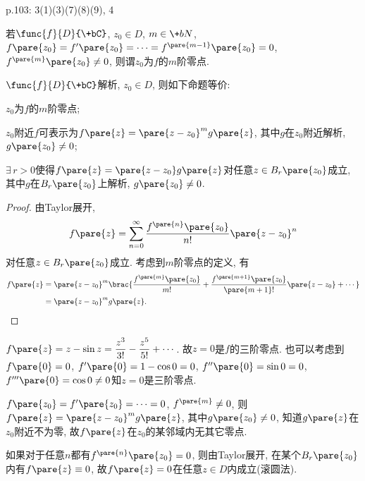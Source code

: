 \documentclass[../ComplexVariable.tex]{subfiles}
\begin{document}
p.103: 3(1)(3)(7)(8)(9), 4


\begin{definition}
    若$\func{f}{D}{\+bC}$, $z_0\in D$, $m\in \+bN$, $f\pare{z_0} = f'\pare{z_0} = \cdots = f^{\pare{m-1}}\pare{z_0} = 0$, $f^{\pare{m}}\pare{z_0}\neq 0$, 则谓$z_0$为$f$的$m$阶零点.
\end{definition}
\begin{theorem}
    $\func{f}{D}{\+bC}$解析, $z_0 \in D$, 则如下命题等价:
    \begin{cenum}
        \item $z_0$为$f$的$m$阶零点;
        \item $z_0$附近$f$可表示为$f\pare{z} = \pare{z-z_0}^mg\pare{z}$, 其中$g$在$z_0$附近解析, $g\pare{z_0}\neq 0$;
        \item $\exists\, r>0$使得$f\pare{z} = \pare{z-z_0}g\pare{z}$对任意$z\in B_r\pare{z_0}$成立, 其中$g$在$B_r\pare{z_0}$上解析, $g\pare{z_0}\neq 0$.
    \end{cenum}
\end{theorem}
\begin{proof}
    由Taylor展开,
    \[ f\pare{z} = \sum_{n=0}^\infty \frac{f^{\pare{n}}\pare{z_0}}{n!}\pare{z-z_0}^n \]
    对任意$z\in B_r\pare{z_0}$成立. 考虑到$m$阶零点的定义, 有
    \begin{align*}
        f\pare{z} &= \pare{z-z_0}^m \brac{\frac{f^{\pare{m}}\pare{z_0}}{m!} + \frac{f^{\pare{m+1}}\pare{z_0}}{\pare{m+1}!}\pare{z-z_0} + \cdots}\\ & = \pare{z-z_0}^m g\pare{z}. \qedhere
    \end{align*}
\end{proof}
\begin{sample}
    \begin{ex}
        $f\pare{z} = \displaystyle z-\sin z = \frac{z^3}{3!} - \frac{z^5}{5!} + \cdots$. 故$z=0$是$f$的三阶零点. 也可以考虑到$f\pare{0} = 0$, $f'\pare{0} = 1-\cos 0 = 0$, $f''\pare{0} = \sin 0 = 0$, $f'''\pare{0} = \cos 0 \neq 0$知$z=0$是三阶零点.
    \end{ex}
\end{sample}
\begin{remark}
    $f\pare{z_0} = f'\pare{z_0} = \cdots = 0$, $f^{\pare{m}}\neq 0$, 则$f\pare{z} = \pare{z-z_0}^mg\pare{z}$, 其中$g\pare{z_0}\neq 0$, 知道$g\pare{z}$在$z_0$附近不为零, 故$f\pare{z}$在$z_0$的某邻域内无其它零点.
\end{remark}
\begin{remark}
    \label{rm:一列为零_处处为零}
    如果对于任意$n$都有$f^{\pare{n}}\pare{z_0} = 0$, 则由Taylor展开, 在某个$B_r\pare{z_0}$内有$f\pare{z} \equiv 0$, 故$f\pare{z} = 0$在任意$z\in D$内成立(滚圆法).
\end{remark}
\end{document}
